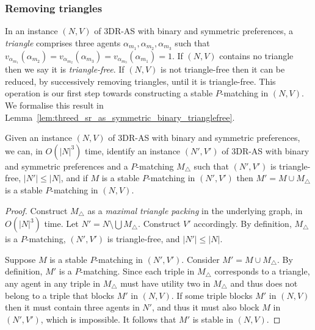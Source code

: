 \subsubsection{Removing triangles}
\label{sec:threed_sr_as_removingtriangles}

In an instance $(N, V)$ of 3DR-AS with binary and symmetric preferences, a \emph{triangle} comprises three agents $\alpha_{m_1}, \alpha_{m_2},\allowbreak \alpha_{m_3}$ such that $v_{\alpha_{m_1}}(\alpha_{m_2}) = v_{\alpha_{m_2}}(\alpha_{m_3}) = v_{\alpha_{m_3}}(\alpha_{m_1}) = 1$. If $(N, V)$ contains no triangle then we say it is \emph{triangle-free}. If $(N, V)$ is not triangle-free then it can be reduced, by successively removing triangles, until it is triangle-free. This operation is our first step towards constructing a stable $P$\nobreakdash-matching in $(N, V)$. We formalise this result in Lemma~\ref{lem:threed_sr_as_symmetric_binary_trianglefree}.

\begin{lem}
\label{lem:threed_sr_as_symmetric_binary_trianglefree}
Given an instance $(N, V)$ of 3DR-AS with binary and symmetric preferences, we can, in $O(|N|^3)$ time, identify an instance $(N', V')$ of 3DR-AS with binary and symmetric preferences and a $P$\nobreakdash-matching $M_{\triangle}$ such that $(N', V')$ is triangle-free, $|N'|\leq |N|$, and if $M$ is a stable $P$\nobreakdash-matching in $(N', V')$ then $M' = M \cup M_{\triangle}$ is a stable $P$\nobreakdash-matching in $(N, V)$.
\end{lem}
\begin{proof}
Construct $M_{\triangle}$ as a \emph{maximal triangle packing} \cite{CHATAIGNER20091396} in the underlying graph, in $O(|N|^3)$ time. Let $N' = N \setminus \bigcup M_{\triangle}$. Construct $V'$ accordingly. By definition, $M_{\triangle}$ is a $P$\nobreakdash-matching, $(N', V')$ is triangle-free, and $|N'| \leq |N|$. 

Suppose $M$ is a stable $P$\nobreakdash-matching in $(N', V')$. Consider $M' = M \cup M_{\triangle}$. By definition, $M'$ is a $P$\nobreakdash-matching. Since each triple in $M_{\triangle}$ corresponds to a triangle, any agent in any triple in $M_{\triangle}$ must have utility two in $M_{\triangle}$ and thus does not belong to a triple that blocks $M'$ in $(N, V)$. If some triple blocks $M'$ in $(N, V)$ then it must contain three agents in $N'$, and thus it must also block $M$ in $(N', V')$, which is impossible. It follows that $M'$ is stable in $(N, V)$.
\end{proof}

